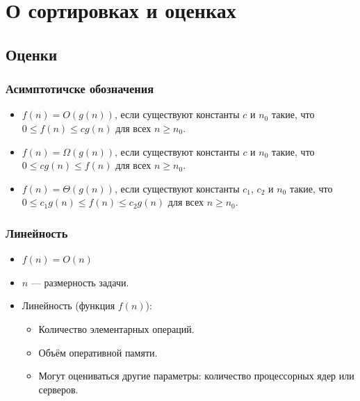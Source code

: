 \documentclass[hyperref={unicode=true}]{beamer}
\begin{document}
\section{О сортировках и оценках}

\subsection{Оценки}

\frame
{
  \frametitle{Асимптотичске обозначения}
  \begin{itemize}
    \item $f(n) = O(g(n))$, если существуют константы $c$ и $n_0$ 
          такие, что $0 \leqslant f(n) \leqslant cg(n)$ 
          для всех $n \geqslant n_0$.
    \vspace{1cm}
    \item $f(n) = \Omega(g(n))$, если существуют константы $c$ и $n_0$ 
         такие, что $0 \leqslant cg(n) \leqslant f(n)$ 
          для всех $n \geqslant n_0$.
    \vspace{1cm}
    \item $f(n) = \Theta(g(n))$, если существуют константы $c_1$, $c_2$ и $n_0$
        такие, что $0 \leqslant c_1g(n) \leqslant f(n) \leqslant c_2g(n)$
        для всех $n \geqslant n_0$.
   \end{itemize} 
}

\frame
{
   \frametitle{Линейность}
   \begin{itemize}
    \item $f(n) = O(n)$
    \item $n$ --- размерность задачи.
    \item Линейность (функция $f(n)$): 
    \begin{itemize}
      \item Количество элементарных операций. 
      \item Объём оперативной памяти.  
      \item Могут оцениваться другие параметры: количество процессорных ядер
        или серверов. 
    \end{itemize}
  \end{itemize}
}

\end{document}
